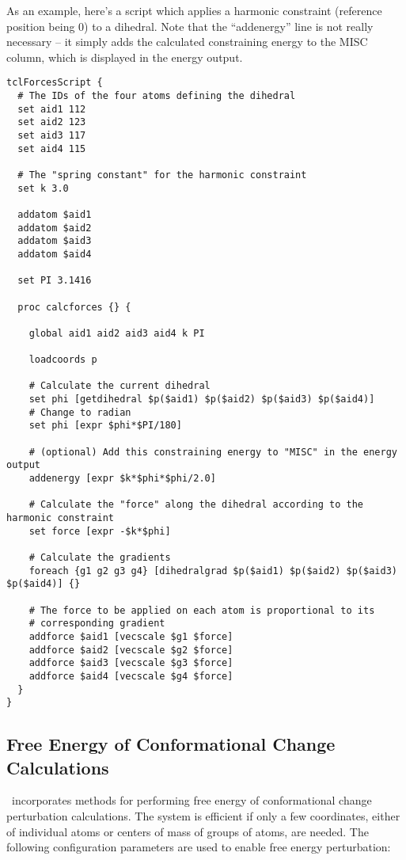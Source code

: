 As an example, here's a script which applies a harmonic
constraint (reference position being 0) to a dihedral. Note that
the ``addenergy'' line is not really necessary -- it simply adds
the calculated constraining energy to the MISC column, which is
displayed in the energy output.

\begin{verbatim}
tclForcesScript {
  # The IDs of the four atoms defining the dihedral
  set aid1 112
  set aid2 123
  set aid3 117
  set aid4 115
  
  # The "spring constant" for the harmonic constraint
  set k 3.0
  
  addatom $aid1
  addatom $aid2
  addatom $aid3
  addatom $aid4
  
  set PI 3.1416
  
  proc calcforces {} {
  
    global aid1 aid2 aid3 aid4 k PI
    
    loadcoords p
    
    # Calculate the current dihedral
    set phi [getdihedral $p($aid1) $p($aid2) $p($aid3) $p($aid4)]
    # Change to radian
    set phi [expr $phi*$PI/180]
    
    # (optional) Add this constraining energy to "MISC" in the energy output
    addenergy [expr $k*$phi*$phi/2.0]
    
    # Calculate the "force" along the dihedral according to the harmonic constraint
    set force [expr -$k*$phi]
    
    # Calculate the gradients
    foreach {g1 g2 g3 g4} [dihedralgrad $p($aid1) $p($aid2) $p($aid3) $p($aid4)] {}
    
    # The force to be applied on each atom is proportional to its
    # corresponding gradient
    addforce $aid1 [vecscale $g1 $force]
    addforce $aid2 [vecscale $g2 $force]
    addforce $aid3 [vecscale $g3 $force]
    addforce $aid4 [vecscale $g4 $force]
  }
}
\end{verbatim}

\subsection{Free Energy of Conformational Change Calculations}
\label{section:fenergy}

\PDAC\ incorporates methods for performing free energy of conformational change perturbation calculations.
The system is efficient if only a few coordinates, either of individual atoms or centers of mass of groups of atoms, are needed.
The following configuration parameters are used to enable free energy perturbation:

